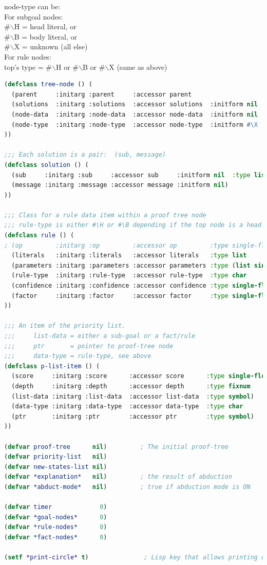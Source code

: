 node-type can be:\\
\tab For subgoal nodes:\\
\tab\tab \#$\backslash$H = head literal, or\\
\tab\tab \#$\backslash$B = body literal, or\\
\tab\tab \#$\backslash$X = unknown (all else)\\
\tab For rule nodes:\\
\tab\tab top's type = \#$\backslash$H or \#$\backslash$B or \#$\backslash$X (same as above)

\begin{lstlisting}[language=Lisp]
(defclass tree-node () (
  (parent     :initarg :parent     :accessor parent                    :type symbol)
  (solutions  :initarg :solutions  :accessor solutions  :initform nil  :type (list solution))
  (node-data  :initarg :node-data  :accessor node-data  :initform nil  :type list)
  (node-type  :initarg :node-type  :accessor node-type  :initform #\X  :type char)
))

;;; Each solution is a pair:  (sub, message)
(defclass solution () (
  (sub     :initarg :sub     :accessor sub     :initform nil  :type list)
  (message :initarg :message :accessor message :initform nil)
))

;;; Class for a rule data item within a proof tree node
;;; rule-type is either #\H or #\B depending if the top node is a head literal or body literal
(defclass rule () (
; (op         :initarg :op         :accessor op         :type single-float)
  (literals   :initarg :literals   :accessor literals   :type list           :initform nil)
  (parameters :initarg :parameters :accessor parameters :type (list single-float))
  (rule-type  :initarg :rule-type  :accessor rule-type  :type char           :initform #\X)
  (confidence :initarg :confidence :accessor confidence :type single-float)
  (factor     :initarg :factor     :accessor factor     :type single-float)
))

;;; An item of the priority list.
;;;     list-data = either a sub-goal or a fact/rule
;;;     ptr       = pointer to proof-tree node
;;;     data-type = rule-type, see above
(defclass p-list-item () (
  (score     :initarg :score      :accessor score      :type single-float  :initform 0.0)
  (depth     :initarg :depth      :accessor depth      :type fixnum        :initform 0)
  (list-data :initarg :list-data  :accessor list-data  :type symbol)
  (data-type :initarg :data-type  :accessor data-type  :type char          :initform #\X)
  (ptr       :initarg :ptr        :accessor ptr        :type symbol)
))

(defvar proof-tree      nil)         ; The initial proof-tree
(defvar priority-list   nil)
(defvar new-states-list nil)
(defvar *explanation*   nil)         ; the result of abduction
(defvar *abduct-mode*   nil)         ; true if abduction mode is ON

(defvar timer             0)
(defvar *goal-nodes*      0)
(defvar *rule-nodes*      0)
(defvar *fact-nodes*      0)

(setf *print-circle* t)               ; Lisp key that allows printing of circular objects
\end{lstlisting}

